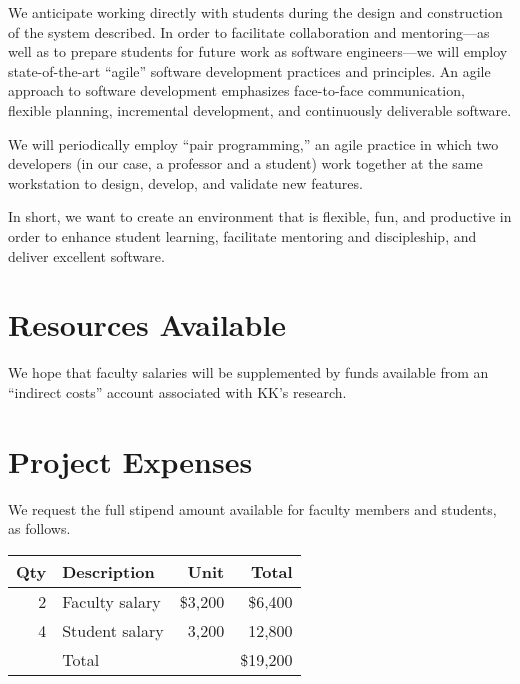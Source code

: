 \documentclass{article}
\begin{document}
We anticipate working directly with students
during the design and construction of the system described.
In order to facilitate collaboration and mentoring---as well as
to prepare students for future work
as software engineers---we will employ state-of-the-art
``agile'' software development
practices and principles.
An agile approach to software development emphasizes
face-to-face communication,
flexible planning,
incremental development,
and continuously deliverable software.

We will periodically employ ``pair programming,''
an agile practice in which two developers
(in our case, a professor and a student)
work together at the same workstation
to design, develop, and validate new features.

In short, we want to create an environment that is
flexible, fun, and productive
in order to enhance student learning,
facilitate mentoring and discipleship,
and deliver excellent software.

\section{Resources Available}
\label{sec:resources-available}



We hope that faculty salaries will be supplemented
by funds available from
an ``indirect costs'' account associated with KK's research.

\section{Project Expenses}
\label{sec:project-expenses}



We request the full stipend amount available for
faculty members and students, as follows.

\begin{center}
  \begin{tabular}{rlrr}
    \toprule
    Qty & Description    & Unit    & Total    \\
    \midrule
    2   & Faculty salary & \$3,200 & \$6,400  \\
    4   & Student salary & 3,200   & 12,800   \\
    \midrule
        & Total          &         & \$19,200 \\
    \bottomrule
  \end{tabular}
\end{center}
\end{document}
